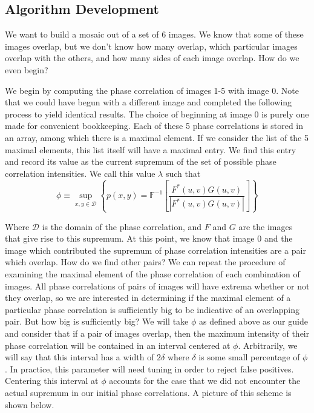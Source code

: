 \documentclass[]{article}
\begin{document}
\subsection{Algorithm Development}
We want to build a mosaic out of a set of 6 images. We know that some of these images overlap, but we don't know how many overlap, which particular images overlap with the others, and how many sides of each image overlap. How do we even begin?

We begin by computing the phase correlation of images 1-5 with image 0. Note that we could have begun with a different image and completed the following process to yield identical results. The choice of beginning at image 0 is purely one made for convenient bookkeeping. Each of these 5 phase correlations is stored in an array, among which there is a maximal element. If we consider the list of the 5 maximal elements, this list itself will have a maximal entry. We find this entry and record its value as the current supremum of the set of possible phase correlation intensities. We call this value $\lambda$ such that 
\[\phi \equiv \sup_{x,y \in \mathcal{D}} \left\{p(x, y)=\mathbb{F}^{-1}\left[\frac{F^{*}(u, v) G(u, v)}{\left|F^{*}(u, v) G(u, v)\right|}\right]\right\}\] 

Where $\mathcal{D}$ is the domain of the phase correlation, and $F$ and $G$ are the images that give rise to this supremum. At this point, we know that image 0 and the image which contributed the supremum of phase correlation intensities are a pair which overlap. How do we find other pairs? We can repeat the procedure of examining the maximal element of the phase correlation of each combination of images. All phase correlations of pairs of images will have extrema whether or not they overlap, so we are interested in determining if the maximal element of a particular phase correlation is sufficiently big to be indicative of an overlapping pair. But how big is sufficiently big? We will take $\phi$ as defined above as our guide and consider that if a pair of images overlap, then the maximum intensity of their phase correlation will be contained in an interval centered at $\phi$. Arbitrarily, we will say that this interval has a width of $2\delta$ where $\delta$ is some small percentage of $\phi$. In practice, this parameter will need tuning in order to reject false positives. Centering this interval at $\phi$ accounts for the case that we did not encounter the actual supremum in our initial phase correlations. A picture of this scheme is shown below.
\end{document}

